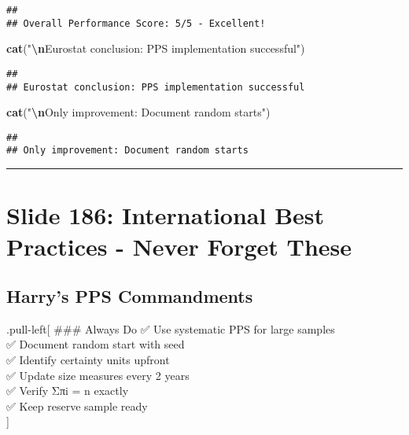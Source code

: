 \documentclass[
]{article}
\newenvironment{Shaded}{\begin{snugshade}}{\end{snugshade}}
\newcommand{\FunctionTok}[1]{\textcolor[rgb]{0.13,0.29,0.53}{\textbf{#1}}}
\newcommand{\NormalTok}[1]{#1}
\newcommand{\SpecialCharTok}[1]{\textcolor[rgb]{0.81,0.36,0.00}{\textbf{#1}}}
\newcommand{\StringTok}[1]{\textcolor[rgb]{0.31,0.60,0.02}{#1}}
\begin{document}
\begin{verbatim}
## 
## Overall Performance Score: 5/5 - Excellent!
\end{verbatim}

\begin{Shaded}
\begin{Highlighting}[]
\FunctionTok{cat}\NormalTok{(}\StringTok{"}\SpecialCharTok{\textbackslash{}n}\StringTok{Eurostat conclusion: PPS implementation successful"}\NormalTok{)}
\end{Highlighting}
\end{Shaded}

\begin{verbatim}
## 
## Eurostat conclusion: PPS implementation successful
\end{verbatim}

\begin{Shaded}
\begin{Highlighting}[]
\FunctionTok{cat}\NormalTok{(}\StringTok{"}\SpecialCharTok{\textbackslash{}n}\StringTok{Only improvement: Document random starts"}\NormalTok{)}
\end{Highlighting}
\end{Shaded}

\begin{verbatim}
## 
## Only improvement: Document random starts
\end{verbatim}

\begin{center}\rule{0.5\linewidth}{0.5pt}\end{center}

\section{Slide 186: International Best Practices - Never Forget
These}\label{slide-186-international-best-practices---never-forget-these}

\subsection{Harry's PPS Commandments}\label{harrys-pps-commandments}

.pull-left{[} \#\#\# Always Do ✅ Use systematic PPS for large samples\\
✅ Document random start with seed\\
✅ Identify certainty units upfront\\
✅ Update size measures every 2 years\\
✅ Verify Σπi = n exactly\\
✅ Keep reserve sample ready\\
{]}
\end{document}
